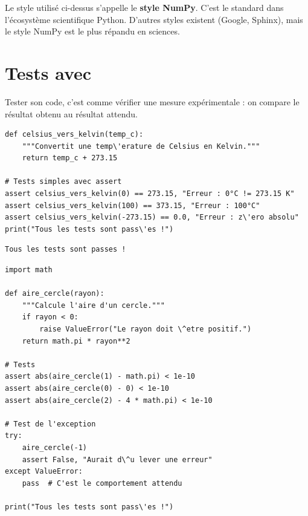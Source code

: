 \begin{remarque}
Le style utilis\'e ci-dessus s'appelle le \textbf{style NumPy}.
C'est le standard dans l'\'ecosyst\`eme scientifique Python. D'autres styles existent
(Google, Sphinx), mais le style NumPy est le plus r\'epandu en sciences.
\end{remarque}

\section{Tests avec }

Tester son code, c'est comme v\'erifier une mesure exp\'erimentale : on compare
le r\'esultat obtenu au r\'esultat attendu.

\begin{codeblock}[title=\textbf{Python}]
\begin{verbatim}
def celsius_vers_kelvin(temp_c):
    """Convertit une temp\'erature de Celsius en Kelvin."""
    return temp_c + 273.15

# Tests simples avec assert
assert celsius_vers_kelvin(0) == 273.15, "Erreur : 0°C != 273.15 K"
assert celsius_vers_kelvin(100) == 373.15, "Erreur : 100°C"
assert celsius_vers_kelvin(-273.15) == 0.0, "Erreur : z\'ero absolu"
print("Tous les tests sont pass\'es !")
\end{verbatim}
\end{codeblock}

\begin{codeoutput}
\begin{verbatim}
Tous les tests sont passes !
\end{verbatim}
\end{codeoutput}

\begin{codeblock}[title=\textbf{Python}]
\begin{verbatim}
import math

def aire_cercle(rayon):
    """Calcule l'aire d'un cercle."""
    if rayon < 0:
        raise ValueError("Le rayon doit \^etre positif.")
    return math.pi * rayon**2

# Tests
assert abs(aire_cercle(1) - math.pi) < 1e-10
assert abs(aire_cercle(0) - 0) < 1e-10
assert abs(aire_cercle(2) - 4 * math.pi) < 1e-10

# Test de l'exception
try:
    aire_cercle(-1)
    assert False, "Aurait d\^u lever une erreur"
except ValueError:
    pass  # C'est le comportement attendu

print("Tous les tests sont pass\'es !")
\end{verbatim}
\end{codeblock}

